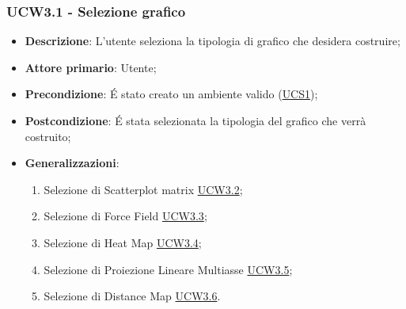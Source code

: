 \subsubsection{UCW3.1 - Selezione grafico}
\label{ssub:ucw3.1}
\begin{itemize}

	\item \textbf{Descrizione}: L’utente seleziona la tipologia di grafico che desidera costruire;

	\item \textbf{Attore primario}: Utente;

	\item \textbf{Precondizione}:   É stato creato un ambiente valido (\hyperref[sub:ucs1]{UCS1});

	\item \textbf{Postcondizione}:  É stata selezionata la tipologia del grafico che verrà costruito;

	\item \textbf{Generalizzazioni}:
	      \begin{enumerate}

		      \item Selezione di Scatterplot matrix \hyperref[ssub:ucw3.2]{UCW3.2};
		      \item Selezione di Force Field \hyperref[ssub:ucw3.3]{UCW3.3};
		      \item Selezione di Heat Map \hyperref[ssub:ucw3.4]{UCW3.4};
		      \item Selezione di Proiezione Lineare Multiasse \hyperref[ssub:ucw3.5]{UCW3.5};
		      \item Selezione di Distance Map \hyperref[ssub:ucw3.6]{UCW3.6}.

	      \end{enumerate}

\end{itemize}


